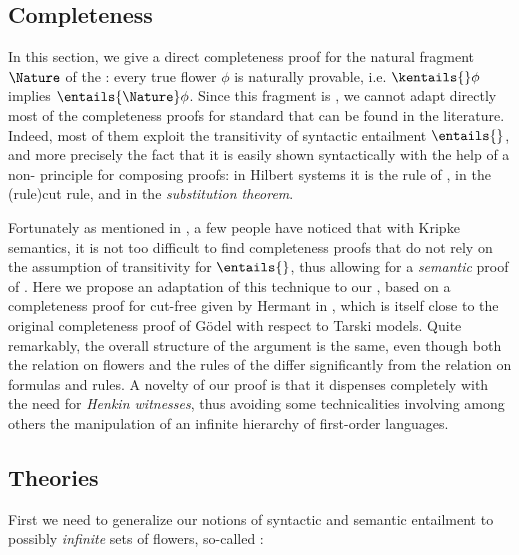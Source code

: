 \begin{scope}
\section{Completeness}

In this section, we give a direct completeness proof for the natural fragment
$\Nature$ of the : every true flower $\phi$ is naturally
provable, i.e. $\kentails{}\phi$ implies $\entails{\Nature} \phi$. Since this
fragment is , we cannot adapt directly most of the completeness proofs
for standard  that can be found in the literature. Indeed, most of
them exploit the transitivity of syntactic entailment $\entails{}$, and more
precisely the fact that it is easily shown syntactically with the help of a
non- principle for composing proofs: in Hilbert systems it is the rule
of  , in  the \kl(rule){cut} rule, and
in  the \emph{substitution theorem}.

Fortunately as mentioned in , a few people have noticed that
with Kripke semantics, it is not too difficult to find completeness proofs that
do not rely on the assumption of transitivity for $\entails{}$, thus allowing
for a \emph{semantic} proof of . Here we propose an adaptation of
this technique to our , based on a completeness proof for
cut-free  given by Hermant in
, which is itself close to the original
completeness proof of Gödel with respect to  Tarski models. Quite
remarkably, the overall structure of the argument is the same, even though both
the  relation on flowers and the rules of the  differ
significantly from the  relation on formulas and  rules.
A novelty of our proof is that it dispenses completely with the need for
\emph{Henkin witnesses}, thus avoiding some technicalities involving among
others the manipulation of an infinite hierarchy of first-order languages.

\subsection{Theories}

First we need to generalize our notions of syntactic and semantic entailment to
possibly \emph{infinite} sets of flowers, so-called \emph{}:


\end{scope}
